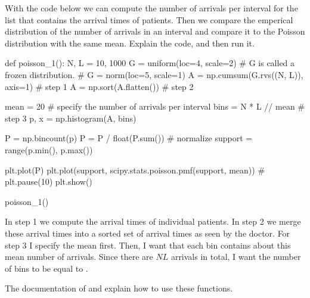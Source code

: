 \begin{exercise}
  With the code below we can compute the number of arrivals per interval for the list  that contains the arrival times of patients.
  Then we compare the emperical distribution of the number of arrivals in an interval  and compare it to the Poisson distribution with the same mean. Explain the code, and then run it.
\begin{pyverbatim}
def poisson_1():
    N, L = 10, 1000
    G = uniform(loc=4, scale=2)  # G is called a frozen distribution.
    # G = norm(loc=5, scale=1)
    A = np.cumsum(G.rvs((N, L)), axis=1)  # step 1
    A = np.sort(A.flatten())  # step 2

    mean = 20  # specify the number of arrivals per interval
    bins = N * L // mean  # step 3
    p, x = np.histogram(A, bins)

    P = np.bincount(p)
    P = P / float(P.sum())  # normalize
    support = range(p.min(), p.max())

    plt.plot(P)
    plt.plot(support, scipy.stats.poisson.pmf(support, mean))
    # plt.pause(10)
    plt.show()


poisson_1()
\end{pyverbatim}
  \begin{solution}
    In step 1 we compute the arrival times of individual patients.
    In step 2 we merge these arrival times into a sorted set of arrival times as seen by the doctor.
    For step 3 I specify the mean first.
    Then, I want that each bin contains about this mean number of arrivals. Since there are $NL$ arrivals in total, I want the number of bins to be equal to .

    The documentation of  and  explain how to use these functions.
  \end{solution}
\end{exercise}

